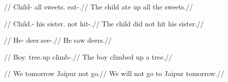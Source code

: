 \documentclass{article}
\begin{document}
\ex
\begingl
\gla{}  
//
\glb Child\M{}-\Erg{} all sweets.\Pl{} eat-\Pfv{}.\Pl//
\glft The child ate up all the sweets.//
\endgl
\xe

\ex
\begingl
\gla{}   
//
\glb Child.\M{}-\Erg{} his sister.\F{} not hit-\Pfv{}.\F//
\glft The child did not hit his sister.//
\endgl
\xe

\ex
\begingl
\gla\textipa{\|[tej-e}  //
\glb He-\Erg{} deer.\Pl see-\Pfv{}.\Pl//
\glft He saw deers.//
\endgl
\xe

\ex
\begingl
\gla{}  \textipa{pan\|[de} \textipa{uk\|[t-a}//
\glb Boy.\Nom{} tree.\M up climb-\Pfv{}.\M//
\glft The boy climbed up a tree.//
\endgl
\xe

\ex
\begingl
\gla{}   
//
\glb We tomorrow Jaipur not go.\Fut//
\glft We will not go to Jaipur tomorrow.//
\endgl
\xe

\printglossary
\printbibliography
\end{document}
